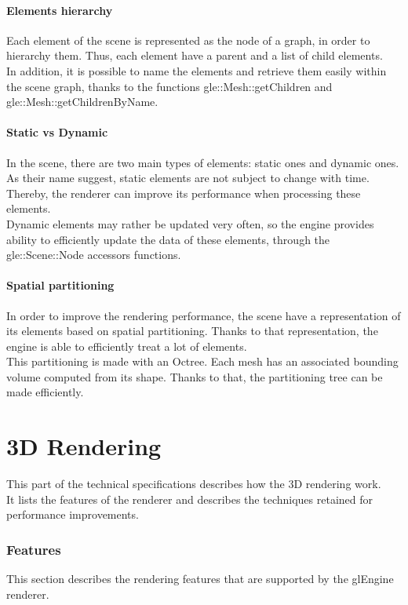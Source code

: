 \documentclass [a4 paper,11pt]{report}
\begin{document}
\subsection{Elements hierarchy}
Each element of the scene is represented as the node of a graph, in order to hierarchy them. Thus, each element have a parent and a list of child elements.\\
In addition, it is possible to name the elements and retrieve them easily within the scene graph, thanks to the functions gle::Mesh::getChildren and gle::Mesh::getChildrenByName.

\subsection{Static vs Dynamic}
In the scene, there are two main types of elements: static ones and dynamic ones.\\
As their name suggest, static elements are not subject to change with time. Thereby, the renderer can improve its performance when processing these elements.\\
Dynamic elements may rather be updated very often, so the engine provides ability to efficiently update the data of these elements, through the gle::Scene::Node accessors functions.

\subsection{Spatial partitioning}
In order to improve the rendering performance, the scene have a representation of its elements based on spatial partitioning. Thanks to that representation, the engine is able to efficiently treat a lot of elements.\\
This partitioning is made with an Octree. Each mesh has an associated bounding volume computed from its shape. Thanks to that, the partitioning tree can be made efficiently. 

\part{3D Rendering}
This part of the technical specifications describes how the 3D rendering work.\\
It lists the features of the renderer and describes the techniques retained for performance improvements.

\section{Features}
This section describes the rendering features that are supported by the glEngine renderer.
\end{document}
